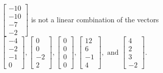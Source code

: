 \begin{exercise}
\begin{exerciseStatement}
  \end{exerciseStatement}
  \begin{exerciseAnswer}
   \(\left[\begin{array}{c}
-10 \\
-10 \\
-7 \\
-2
\end{array}\right]\) 
  	 is not  
	a linear combination of the vectors \(\left[\begin{array}{c}
-4 \\
-2 \\
-1 \\
0
\end{array}\right] , \left[\begin{array}{c}
0 \\
0 \\
-2 \\
2
\end{array}\right] , \left[\begin{array}{c}
0 \\
0 \\
0 \\
0
\end{array}\right] , \left[\begin{array}{c}
12 \\
6 \\
-1 \\
4
\end{array}\right] , \text{ and } \left[\begin{array}{c}
4 \\
2 \\
3 \\
-2
\end{array}\right]\).

	
  


  \end{exerciseAnswer}
\end{exercise}